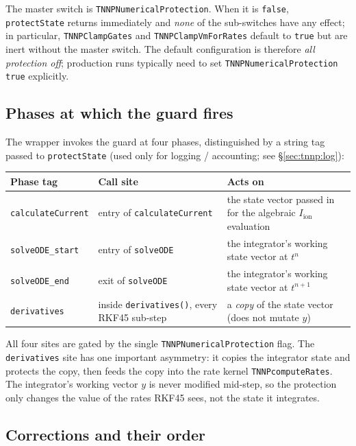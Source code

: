 \documentclass[11pt,a4paper]{article}
\newcommand{\Iion}{I_{\text{ion}}}
\newcommand{\code}[1]{\texttt{\small #1}}
\begin{document}
The master switch is \code{TNNPNumericalProtection}. When it is
\code{false}, \code{protectState} returns immediately and \emph{none}
of the sub-switches have any effect; in particular,
\code{TNNPClampGates} and \code{TNNPClampVmForRates} default to
\code{true} but are inert without the master switch. The default
configuration is therefore \emph{all protection off}; production runs
typically need to set \code{TNNPNumericalProtection true} explicitly.

\subsection{Phases at which the guard fires}
\label{sec:tnnp:phases}

The wrapper invokes the guard at four phases, distinguished by a
string tag passed to \code{protectState} (used only for logging /
accounting; see \S\ref{sec:tnnp:log}):

\begin{center}
\begin{tabular}{@{}lll@{}}
\toprule
Phase tag & Call site & Acts on \\
\midrule
\code{calculateCurrent} & entry of \code{calculateCurrent}
   & the state vector passed in for the algebraic
     $\Iion$ evaluation \\
\code{solveODE\_start}  & entry of \code{solveODE}
   & the integrator's working state vector at $t^{n}$ \\
\code{solveODE\_end}    & exit of \code{solveODE}
   & the integrator's working state vector at $t^{n+1}$ \\
\code{derivatives}      & inside \code{derivatives()}, every
                          RKF45 sub-step
   & a \emph{copy} of the state vector (does not mutate $y$) \\
\bottomrule
\end{tabular}
\end{center}

All four sites are gated by the single \code{TNNPNumericalProtection}
flag. The \code{derivatives} site has one important asymmetry: it
copies the integrator state and protects the copy, then feeds the copy
into the rate kernel \code{TNNPcomputeRates}. The integrator's working
vector $y$ is never modified mid-step, so the protection only changes
the value of the rates RKF45 sees, not the state it integrates.

\subsection{Corrections and their order}
\label{sec:tnnp:steps}
\end{document}
